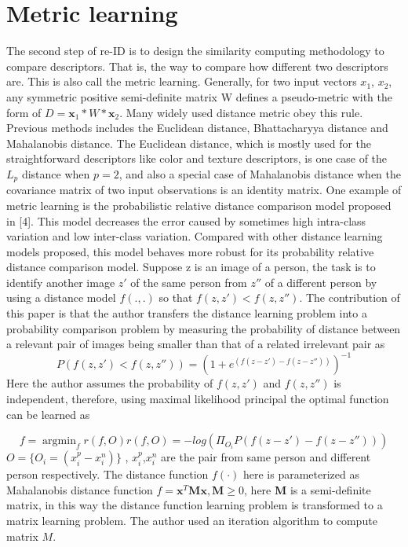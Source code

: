 \section{Metric learning}
The second step of re-ID is to design the similarity computing methodology to compare descriptors. That is, the way to compare how different two descriptors are. This is also call the metric learning. Generally, for two input vectors $x_1$, $x_2$, any symmetric positive semi-definite matrix W defines a pseudo-metric with the form of $D = \bm{x}_1*W*\bm{x}_2$. Many widely used distance metric obey this rule. Previous methods includes the Euclidean distance, Bhattacharyya distance and Mahalanobis distance. The Euclidean distance, which is mostly used for the straightforward descriptors like color and texture descriptors,  is one case of the $L_p$ distance when $p=2$, and also a special case of Mahalanobis distance when the covariance matrix of two input observations is an identity matrix. One example of metric learning is the probabilistic relative distance comparison model proposed in [4]. This model decreases the error caused by sometimes high intra-class variation and low inter-class variation. Compared with other distance learning models proposed, this model behaves more robust for its probability relative distance comparison model. Suppose z is an image of a person, the task is to identify another image $z'$ of the same person from $z''$ of a different person by using a distance model $f(.,.)$ so that $f(z, z')< f(z, z'')$. The contribution of this paper is that the author transfers the distance learning problem into a probability comparison problem by measuring the probability of distance between a relevant pair of images being smaller than that of a related irrelevant pair as
\begin{equation}P(f(z,z')<f(z,z'')) = (1+e^{(f(z-z')-f(z-z''))})^{-1}\end{equation}
Here the author assumes the probability of $f(z,z')$ and $f(z,z'')$ is independent, therefore, using maximal likelihood principal the optimal function can be learned as

\begin{equation}
f = \mathop{\arg\min}_f r(f,O) 
r(f,O) = -log(\Pi_{O_i}P(f(z-z')-f(z-z'')))
\end{equation}
$O=\{O_i=(x_i^p-x_i^n)\}$ , $x_i^p$,$x_i^n$ are the pair from same person and different person respectively.
The distance function $f(\cdot)$ here is parameterized as Mahalanobis distance function
$f=\bm{x}^T\bm{M}\bm{x},\bm{M}\ge0$,
here \textbf{M} is a semi-definite matrix, in this way the distance function learning problem is transformed to a matrix learning problem. The author used an iteration algorithm to compute matrix $M$.

